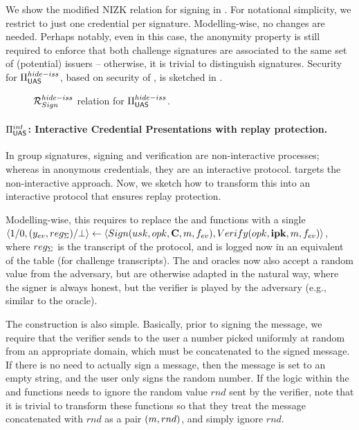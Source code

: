 We show the modified NIZK relation for signing in . For
notational simplicity, we restrict to just one credential per signature.
%
Modelling-wise, no changes are needed. Perhaps notably, even in this case, the
anonymity property is still required to enforce that both challenge signatures
are associated to the same set of (potential) issuers -- otherwise, it is
trivial to distinguish signatures. Security for $\Pi_{\mathsf{UAS}}^{hide-iss}$, based on
security of \CUASGen, is sketched in .

\begin{figure}[ht!]
  \scalebox{0.9}{
    
  }
  \caption{$\mathcal{R}^{hide-iss}_{Sign}$ relation for $\Pi_{\mathsf{UAS}}^{hide-iss}$.}
  \label{fig:nizk-ring}
\end{figure}

\paragraph{$\Pi_{\mathsf{UAS}}^{int}$: Interactive Credential Presentations with replay
  protection.}
%
In group signatures, signing and verification are non-interactive processes;
whereas in anonymous credentials, they are an interactive protocol. \CUASGen
targets the non-interactive approach. Now, we sketch how to transform this into
an interactive protocol that ensures replay protection.

Modelling-wise, this requires to replace the \Sign and \Verify functions with
a single $\langle 1/0,(y_{ev},reg_{\Sigma})/\bot \rangle \gets \langle
Sign(usk,opk,\mathbf{C},m,f_{ev}), Verify(opk,\mathbf{ipk},m,f_{ev}) \rangle$,
where $reg_{\Sigma}$ is the transcript of the protocol, and is logged now in
an equivalent of the \SIG table (\CSIG for challenge transcripts). The \SIGN
and \CHALb oracles now also accept a random value from the adversary, but
are otherwise adapted in the natural way, where the signer is always honest, but
the verifier is played by the adversary (e.g., similar to the \OBTAIN oracle).

The construction is also simple. Basically, prior to signing the message, we
require that the verifier sends to the user a number picked uniformly at random
from an appropriate domain, which must be concatenated to the signed message. If
there is no need to actually sign a message, then the message is set to an empty
string, and the user only signs the random number.
%
If the logic within the \feval and \finsp functions needs to ignore the random
value $rnd$ sent by the verifier, note that it is trivial to transform these
functions so that they treat the message concatenated with $rnd$ as a pair
$(m,rnd)$, and simply ignore $rnd$.

